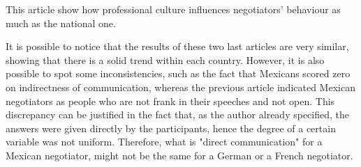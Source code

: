\documentclass[../main.tex]{subfiles}
\begin{document}
This article show how professional culture influences negotiators' behaviour as much as the national one.

It is possible to notice that the results of these two last articles are very similar, showing that there is a solid trend within each country. However, it is also possible to spot some inconsistencies, such as the fact that Mexicans scored zero on indirectness of communication, whereas the previous article indicated Mexican negotiators as people who are not frank in their speeches and not open. This discrepancy can be justified in the fact that, as the author already specified, the answers were given directly by the participants, hence the degree of a certain variable was not uniform. Therefore, what is "direct communication" for a Mexican negotiator, might not be the same for a German or a French negotiator.

\vspace{0.3cm}
\begin{minipage}{\linewidth}
\end{minipage}
\vspace{0.3cm}
\end{document}
